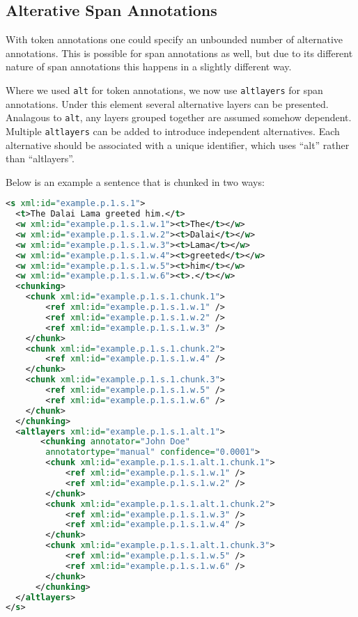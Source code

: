 \documentclass[a4paper,12pt]{report}
\begin{document}
\subsection{Alterative Span Annotations}

With token annotations one could specify an unbounded number of alternative annotations. This is possible for span annotations as well, but due to its different nature of span annotations this happens in a slightly different way.

Where we used \texttt{alt} for token annotations, we now use \texttt{altlayers} for span annotations. Under this element several alternative layers can be presented. Analagous to \texttt{alt}, any layers grouped together are assumed somehow dependent. Multiple \texttt{altlayers} can be added to introduce independent alternatives. Each alternative should be associated with a unique identifier, which uses ``alt'' rather than ``altlayers''. 

Below is an example a sentence that is chunked in two ways:

\begin{lstlisting}[language=xml]
<s xml:id="example.p.1.s.1">
  <t>The Dalai Lama greeted him.</t>
  <w xml:id="example.p.1.s.1.w.1"><t>The</t></w>
  <w xml:id="example.p.1.s.1.w.2"><t>Dalai</t></w>
  <w xml:id="example.p.1.s.1.w.3"><t>Lama</t></w>
  <w xml:id="example.p.1.s.1.w.4"><t>greeted</t></w>
  <w xml:id="example.p.1.s.1.w.5"><t>him</t></w>
  <w xml:id="example.p.1.s.1.w.6"><t>.</t></w>
  <chunking>
    <chunk xml:id="example.p.1.s.1.chunk.1">       
        <ref xml:id="example.p.1.s.1.w.1" />       
        <ref xml:id="example.p.1.s.1.w.2" />       
        <ref xml:id="example.p.1.s.1.w.3" />        
    </chunk>
    <chunk xml:id="example.p.1.s.1.chunk.2">       
        <ref xml:id="example.p.1.s.1.w.4" />
    </chunk>
    <chunk xml:id="example.p.1.s.1.chunk.3">       
        <ref xml:id="example.p.1.s.1.w.5" />
        <ref xml:id="example.p.1.s.1.w.6" />
    </chunk>    
  </chunking>
  <altlayers xml:id="example.p.1.s.1.alt.1">
       <chunking annotator="John Doe" 
        annotatortype="manual" confidence="0.0001">
        <chunk xml:id="example.p.1.s.1.alt.1.chunk.1">       
            <ref xml:id="example.p.1.s.1.w.1" />       
            <ref xml:id="example.p.1.s.1.w.2" />                       
        </chunk>
        <chunk xml:id="example.p.1.s.1.alt.1.chunk.2">       
            <ref xml:id="example.p.1.s.1.w.3" />  
            <ref xml:id="example.p.1.s.1.w.4" />
        </chunk>
        <chunk xml:id="example.p.1.s.1.alt.1.chunk.3">       
            <ref xml:id="example.p.1.s.1.w.5" />
            <ref xml:id="example.p.1.s.1.w.6" />
        </chunk>    
      </chunking>   
  </altlayers>
</s>
\end{lstlisting}
\end{document}

